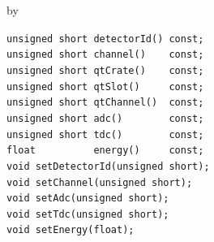 \documentclass[twoside]{article}
\newcommand{\entrylabel}[1]{\mbox{\textbf{{#1}}}\hfil}%
\newenvironment{entry}
{\begin{list}{}%
    {\renewcommand{\makelabel}{\entrylabel}%
     \setlength{\labelwidth}{90pt}%
     \setlength{\leftmargin}{\labelwidth}
     \advance\leftmargin by \labelsep%
      }%
    }%
  {\end{list}}
\newcommand{\Entrylabel}[1]%
{\raisebox{0pt}[1ex][0pt]{\makebox[\labelwidth][l]%
    {\parbox[t]{\labelwidth}{\hspace{0pt}\textbf{{#1}}}}}}
\newenvironment{Entry}%
{\renewcommand{\entrylabel}{\Entrylabel}\begin{entry}}%
  {\end{entry}}
\begin{document}
\begin{Entry}
\item[Public Member\\ Functions]
    \verb+unsigned short detectorId() const;+\\
    \verb+unsigned short channel()    const;+\\
    \verb+unsigned short qtCrate()    const;+\\
    \verb+unsigned short qtSlot()     const;+\\
    \verb+unsigned short qtChannel()  const;+\\
    \verb+unsigned short adc()        const;+\\
    \verb+unsigned short tdc()        const;+\\
    \verb+float          energy()     const;+\\
    \verb+void setDetectorId(unsigned short);+\\
    \verb+void setChannel(unsigned short);+\\
    \verb+void setAdc(unsigned short);+\\
    \verb+void setTdc(unsigned short);+\\
    \verb+void setEnergy(float);+\\
\end{Entry}
\clearpage

\end{document}
